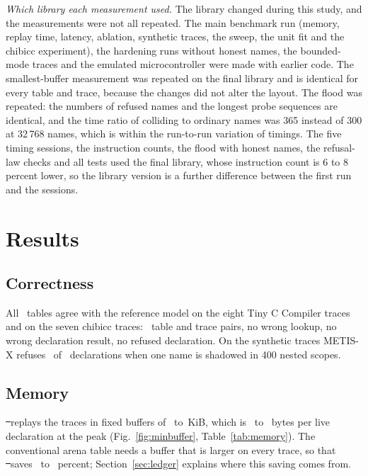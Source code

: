 \emph{Which library each measurement used.} The library changed during this study, and the measurements were not all repeated. The main benchmark run (memory, replay time, latency, ablation, synthetic traces, the sweep, the unit fit and the chibicc experiment), the hardening runs without honest names, the bounded-mode traces and the emulated microcontroller were made with earlier code. The smallest-buffer measurement was repeated on the final library and is identical for every table and trace, because the changes did not alter the layout. The flood was repeated: the numbers of refused names and the longest probe sequences are identical, and the time ratio of colliding to ordinary names was 365 instead of 300 at 32\,768 names, which is within the run-to-run variation of timings. The five timing sessions, the instruction counts, the flood with honest names, the refusal-law checks and all tests used the final library, whose instruction count is 6 to 8 percent lower, so the library version is a further difference between the first run and the sessions.

\section{Results}
\label{sec:results}

\subsection{Correctness}
All \NTables\ tables agree with the reference model on the eight Tiny C Compiler traces and on the seven chibicc traces: \NPairsAll\ table and trace pairs, no wrong lookup, no wrong declaration result, no refused declaration. On the synthetic traces METIS-X refuses \MetisRefused\ of \MetisRefusedOf\ declarations when one name is shadowed in 400 nested scopes.

\subsection{Memory}

\st\ replays the traces in fixed buffers of \MinBufLo\ to \MinBufHi\,KiB, which is \BytesLo\ to \BytesHi\ bytes per live declaration at the peak (Fig.~\ref{fig:minbuffer}, Table~\ref{tab:memory}). The conventional arena table needs a buffer that is larger on every trace, so that \st\ saves \SaveLo\ to \SaveHi\ percent; Section~\ref{sec:ledger} explains where this saving comes from.


